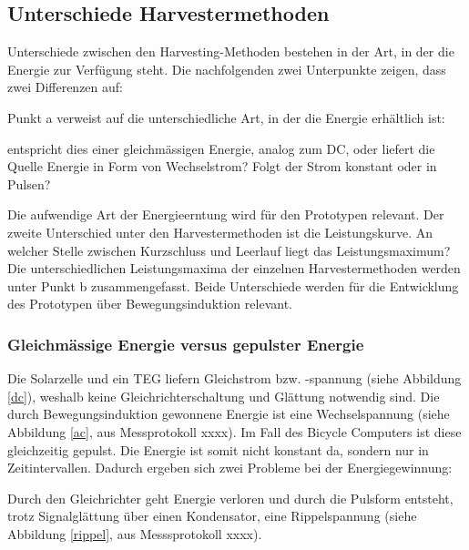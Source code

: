 \subsection{Unterschiede Harvestermethoden}\label{harv_diff} 

Unterschiede zwischen den Harvesting-Methoden bestehen in der Art, in der die Energie zur Verfügung steht. Die nachfolgenden zwei Unterpunkte zeigen, dass zwei Differenzen auf: 

Punkt a verweist auf die unterschiedliche Art, in der die Energie erhältlich ist:

entspricht dies einer gleichmässigen Energie, analog zum DC, oder liefert die Quelle Energie in Form von Wechselstrom? Folgt der Strom konstant oder in Pulsen?

Die aufwendige Art  der Energieerntung wird für den Prototypen relevant.  Der zweite Unterschied unter den Harvestermethoden ist die Leistungskurve. An welcher Stelle zwischen Kurzschluss  und Leerlauf liegt das Leistungsmaximum? Die unterschiedlichen Leistungsmaxima der einzelnen Harvestermethoden werden unter Punkt b zusammengefasst. Beide Unterschiede werden für die Entwicklung des Prototypen über Bewegungsinduktion relevant.

\subsubsection{Gleichmässige Energie versus gepulster Energie}


Die Solarzelle und ein TEG liefern Gleichstrom bzw. -spannung (siehe Abbildung \ref{dc}), weshalb keine Gleichrichterschaltung und Glättung notwendig sind. Die durch Bewegungsinduktion gewonnene Energie ist eine Wechselspannung (siehe Abbildung \ref{ac}, aus Messprotokoll  xxxx). Im Fall des Bicycle Computers ist diese gleichzeitig gepulst.  Die Energie ist somit nicht konstant da, sondern nur in Zeitintervallen. Dadurch ergeben sich zwei Probleme bei der Energiegewinnung: 

Durch den Gleichrichter geht Energie verloren und durch die Pulsform entsteht, trotz Signalglättung über einen Kondensator, eine Rippelspannung (siehe Abbildung \ref{rippel}, aus Messsprotokoll xxxx). 

